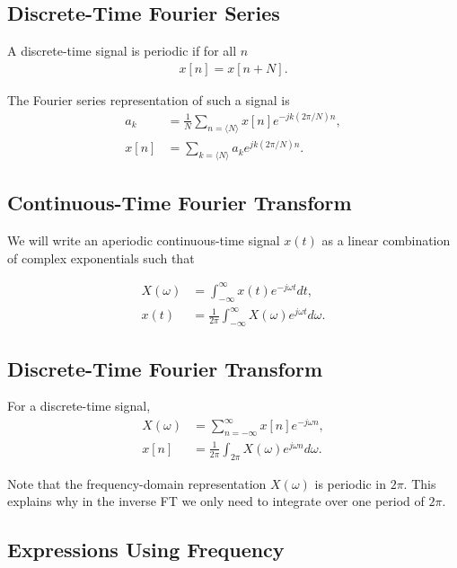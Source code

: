 \documentclass{article}
\begin{document}
\subsection{Discrete-Time Fourier Series}

A discrete-time signal is periodic if for all $n$
\begin{align}
    x[n] = x[n + N].
\end{align}

The Fourier series representation of such a signal is
\begin{align}
    a_k &= \frac{1}{N} \sum_{n=\langle N\rangle} x[n] e^{-jk(2\pi/N)n}, \\
    x[n] &= \sum_{k=\langle N\rangle} a_k e^{jk(2\pi/N)n}.
\end{align}


\subsection{Continuous-Time Fourier Transform}

We will write an aperiodic continuous-time signal $x(t)$ as a linear combination of complex exponentials such that

\begin{align}
    X(\omega) &= \int_{-\infty}^\infty x(t)e^{-j\omega t}dt, \\
    x(t) &= \frac{1}{2\pi}\int_{-\infty}^\infty X(\omega) e^{j\omega t}d\omega.
\end{align}

\subsection{Discrete-Time Fourier Transform}

For a discrete-time signal, 
\begin{align}
    X(\omega) &= \sum_{n=-\infty}^\infty x[n] e^{-j\omega n},\\
    x[n] &= \frac{1}{2\pi}\int_{2\pi} X(\omega) e^{j\omega n} d\omega.
\end{align}

Note that the frequency-domain representation $X(\omega)$ is periodic in $2\pi$. This explains why in the inverse FT we only need to integrate over one period of $2\pi$.

\subsection{Expressions Using Frequency}
\end{document}
